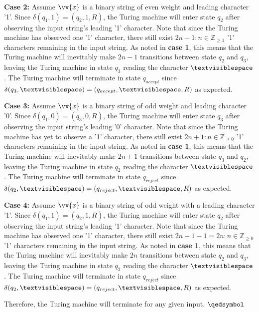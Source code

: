 \documentclass{article}
\begin{document}
\begin{prf}
\begin{adjustwidth}{0.5cm}{}
\end{adjustwidth}
\begin{adjustwidth}{0.5cm}{}
	\textbf{Case 2:} Assume $\vv{x}$ is a binary string of even weight and leading character '1'.  Since $\delta(q_{1}, 1) = (q_{2}, 1, R)$, the Turing machine will enter state $q_{2}$ after observing the input string's leading '1' character.  Note that since the Turing machine has observed one '1' character, there still exist $2n - 1 : n \in \mathbb{Z}_{\geq 1}$ '1' characters remaining in the input string.  As noted in \textbf{case 1}, this means that the Turing machine will inevitably make $2n - 1$ transitions between state $q_{2}$ and $q_{3}$, leaving the Turing machine in state $q_{3}$ reading the character $\textvisiblespace$.  The Turing machine will terminate in state $q_{accept}$ since $\delta(q_{3}, \textvisiblespace) = (q_{accept}, \textvisiblespace, R)$ as expected.\\
\end{adjustwidth}
\begin{adjustwidth}{0.5cm}{}
	\textbf{Case 3:} Assume $\vv{x}$ is a binary string of odd weight and leading character '0'.  Since $\delta(q_{1}, 0) = (q_{3}, 0, R)$, the Turing machine will enter state $q_{3}$ after observing the input string's leading '0' character.  Note that since the Turing machine has yet to observe a '1' character, there still exist $2n + 1 : n \in \mathbb{Z}_{\geq 0}$ '1' characters remaining in the input string.  As noted in \textbf{case 1}, this means that the Turing machine will inevitably make $2n + 1$ transitions between state $q_{3}$ and $q_{2}$, leaving the Turing machine in state $q_{2}$ reading the character $\textvisiblespace$.  The Turing machine will terminate in state $q_{reject}$ since $\delta(q_{2}, \textvisiblespace) = (q_{reject}, \textvisiblespace, R)$ as expected.\\
\end{adjustwidth}
\begin{adjustwidth}{0.5cm}{}
	\textbf{Case 4:} Assume $\vv{x}$ is a binary string of odd weight with a leading character '1'.  Since $\delta(q_{1}, 1) = (q_{2}, 1, R)$, the Turing machine will enter state $q_{2}$ after observing the input string's leading '1' character.  Note that since the Turing machine has observed one '1' character, there still exist $2n + 1 - 1 = 2n : n \in \mathbb{Z}_{\geq 0}$ '1' characters remaining in the input string.  As noted in \textbf{case 1}, this means that the Turing machine will inevitably make $2n$ transitions between state $q_{2}$ and $q_{3}$, leaving the Turing machine in state $q_{2}$ reading the character $\textvisiblespace$.  The Turing machine will terminate in state $q_{reject}$ since $\delta(q_{2}, \textvisiblespace) = (q_{reject}, \textvisiblespace, R)$ as expected. \\
\end{adjustwidth}
	\noindent Therefore, the Turing machine will terminate for any given input. $\qedsymbol$
\end{prf}
\end{document}

